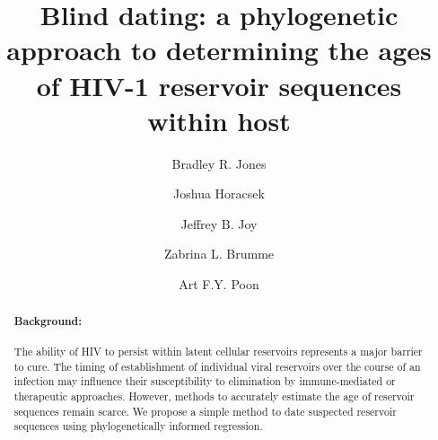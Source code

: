 \documentclass{bmcart}
\begin{document}
\pagewiselinenumbers

\begin{frontmatter}

\begin{fmbox}


\title{Blind dating: a phylogenetic approach to determining the ages of HIV-1 reservoir sequences within host}

\author[addressref={1,2},email={brj1@sfu.ca}]{Bradley R. Jones} %
\author[addressref={1,2},email={jjh13@sfu.ca}]{Joshua Horacsek} %
\author[addressref={2,3},email={jjoy@cfenet.ubc.ca}]{Jeffrey B. Joy} %
\author[addressref={1,2},email={zbrumme@sfu.ca}]{Zabrina L. Brumme} %
\author[addressref={1,2,3},email={apoon@cfenet.ubc.ca},corref={3}]{Art F.Y. Poon} %
\address[id=1]{    }
\address[id=2]{   , }
\address[id=3]{    }



\begin{artnotes}
\end{artnotes}

\end{fmbox}

\begin{abstractbox}
\begin{abstract}
\paragraph{Background:}
The ability of HIV to persist within latent cellular reservoirs represents a major barrier to
cure.
The timing of establishment of individual viral reservoirs over the course of an infection may influence their susceptibility to elimination by immune-mediated or therapeutic approaches.
However, methods to accurately estimate the age of reservoir sequences remain scarce.
We propose a simple method to date suspected reservoir sequences using phylogenetically informed regression.
 

\end{abstract}
\end{abstractbox}
\end{frontmatter}
\end{document}
